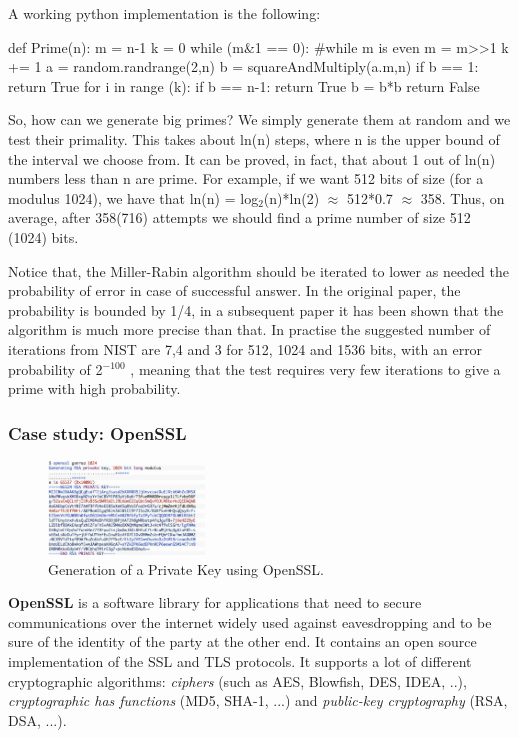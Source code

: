 \documentclass[a4paper, 12pt]{report}
\begin{document}
A working python implementation is the following:
\begin{python}
def Prime(n):
	m = n-1
	k = 0
	while (m&1 == 0): 		#while m is even
		m = m>>1
		k += 1
	a = random.randrange(2,n)
	b = squareAndMultiply(a.m,n)
	if b == 1:
		return True
	for i in range (k):
		if b == n-1:
			return True
		b = b*b %
	return False
\end{python}

So, how can we generate big primes? We simply generate them at random and we test their primality. This takes about ln(n) steps, where n is the upper bound of the interval we choose from. It can be proved, in fact, that about 1 out of ln(n) numbers less than n are prime. For example, if we want 512 bits of size (for a modulus 1024), we have that ln(n) = log$_2$(n)*ln(2) $\approx$ 512*0.7 $\approx$ 358. Thus, on average, after 358(716) attempts we should find a prime number of size 512 (1024) bits. 

Notice that, the Miller-Rabin algorithm should be iterated to lower as needed the probability of error in case of successful answer. In the original paper, the probability is bounded by 1/4, in a subsequent paper it has been shown that the algorithm is much more precise than that. In practise the suggested number of iterations from NIST are 7,4 and 3 for 512, 1024 and 1536 bits, with an error probability of 2$^{-100}$ , meaning that the test requires very few iterations to give a prime with high probability.

\subsubsection{Case study: OpenSSL}
\begin{figure}
	\includegraphics[width=0.37\textwidth]{images/lec17/openssl.png}
	\caption{Generation of a Private Key using OpenSSL.}
	\label{fig:openssl}
\end{figure}

\textbf{OpenSSL} is a software library for applications that need to secure communications over the internet widely used against eavesdropping and to be sure of the identity of the party at the other end. It contains an open source implementation of the SSL and TLS protocols. It supports a lot of different cryptographic algorithms: \textit{ciphers} (such as AES, Blowfish, DES, IDEA, ..), \textit{cryptographic has functions} (MD5, SHA-1, ...) and \textit{public-key cryptography} (RSA, DSA, ...).
\end{document}

